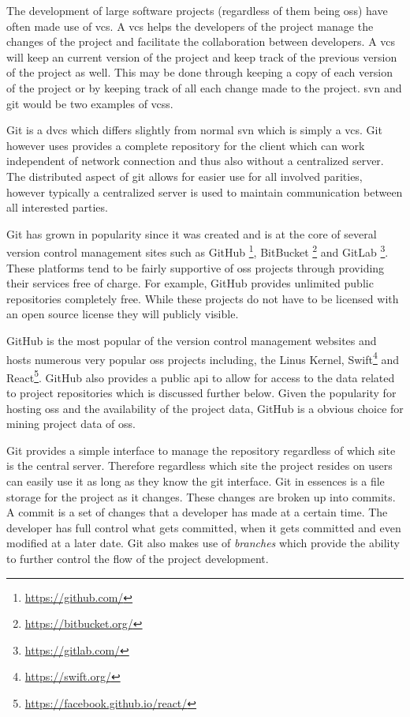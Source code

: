 The development of large software projects (regardless of them being \gls{oss}) have often made use of \gls{vcs}. A \gls{vcs} helps the developers of the project manage the changes of the project and facilitate the collaboration between developers. A \gls{vcs} will keep an current version of the project and keep track of the previous version of the project as well. This may be done through keeping a copy of each version of the project or by keeping track of all each change made to the project. \gls{svn} and git would be two examples of \gls{vcs}s.

Git is a \gls{dvcs} which differs slightly from normal \gls{svn} which is simply a \gls{vcs}. Git however uses provides a complete repository for the client which can work independent of network connection and thus also without a centralized server. The distributed aspect of git allows for easier use for all involved parities, however typically a centralized server is used to maintain communication between all interested parties.

Git has grown in popularity since it was created and is at the core of several version control management sites such as GitHub \footnote{\url{https://github.com/}}, BitBucket \footnote{\url{https://bitbucket.org/}} and GitLab \footnote{\url{https://gitlab.com/}}. These platforms tend to be fairly supportive of \gls{oss} projects through providing their services free of charge. For example, GitHub provides unlimited public repositories completely free. While these projects do not have to be licensed with an open source license they will publicly visible.


GitHub is the most popular of the version control management websites and hosts numerous very popular \gls{oss} projects including, the Linus Kernel, Swift\footnote{\url{https://swift.org/}} and React\footnote{\url{https://facebook.github.io/react/}}. GitHub also provides a public \gls{api} to allow for access to the data related to project repositories which is discussed further below. %
Given the popularity for hosting \gls{oss} and the availability of the project data, GitHub is a obvious choice for mining project data of \gls{oss}.


Git provides a simple interface to manage the repository regardless of which site is the central server. Therefore regardless which site the project resides on users can easily use it as long as they know the git interface. Git in essences is a file storage for the project as it changes. These changes are broken up into commits. A commit is a set of changes that a developer has made at a certain time. The developer has full control what gets committed, when it gets committed and even modified at a later date. Git also makes use of \textit{branches} which provide the ability to further control the flow of the project development. 

